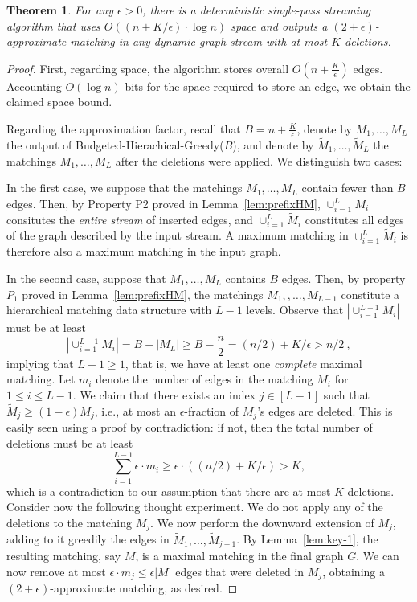 \documentclass[11pt,a4paper]{article}
\newtheorem{theorem}{Theorem}
\begin{document}
\setcounter{thmsaved}{\value{theorem}}
\setcounter{theorem}{\value{counterUB2}}
\addtocounter{theorem}{-1}

\begin{theorem}
For any $\epsilon > 0$, there is a deterministic single-pass streaming algorithm that uses $O((n + K/\epsilon) \cdot \log n)$ space and outputs a $(2+\epsilon)$-approximate matching in any dynamic graph stream with at most $K$ deletions.
\end{theorem} 


\setcounter{theorem}{\value{thmsaved}} 



\begin{proof}
First, regarding space, the algorithm stores overall  $O(n + \frac{K}{\epsilon})$ edges. Accounting $O(\log n)$ bits for the space required to store an edge, we obtain the claimed space bound.

Regarding the approximation factor, recall that $B = n + \frac{K}{\epsilon}$, denote by $M_1, \dots, M_L$ the output of \textsf{Budgeted-Hierachical-Greedy}($B$), and denote by $\tilde{M}_1, \dots, \tilde{M}_L$ the matchings $M_1, \dots, M_L$ after the deletions were applied. We distinguish two cases:

In the first case, we suppose that the matchings $M_1, \dots, M_{L}$ contain fewer than $B$ edges. Then, by Property P2 proved in Lemma~\ref{lem:prefixHM}, $\cup_{i=1}^{L}M_i$ consitutes the {\em entire stream} of inserted edges, and $\cup_{i=1}^L \tilde{M}_i$  constitutes all edges of the graph described by the input stream. A maximum matching in $\cup_{i=1}^L \tilde{M}_i$ is therefore also a maximum matching in the input graph. 

In the second case, suppose that $M_1, \dots, M_{L}$ contains $B$ edges.  Then, by property $P_1$ proved in Lemma~\ref{lem:prefixHM}, the matchings $M_1, , \dots, M_{L-1}$ constitute a hierarchical matching data structure with $L-1$ levels. Observe that $|\cup_{i=1}^{L-1}M_i|$ must be at least 
$$|\cup_{i=1}^{L-1}M_i| = B - |M_L| \ge B - \frac{n}{2} = (n/2) + K/\epsilon > n/2 \ ,$$ implying that $L-1 \ge 1$, that is,  we have at least one {\em complete} maximal matching. Let $m_i$ denote the number of edges in the matching $M_i$ for $1 \le i \le L-1$. 
We claim that there exists an index $j \in [L-1]$ such that $\tilde{M}_j \ge (1-\epsilon) M_j$, i.e., at most an $\epsilon$-fraction of $M_j$'s edges are deleted. This is easily seen using a proof by contradiction: if not, then the total number of deletions must be at least
$$\sum_{i=1}^{L-1} \epsilon \cdot m_i \ge \epsilon \cdot ((n/2) + K/\epsilon) > K,$$
which is a contradiction to our assumption that there are at most $K$ deletions. Consider now the following thought experiment. We do not apply any of the deletions to the matching $M_j$. We now perform the downward extension of $M_j$, adding to it greedily the edges in $\tilde{M}_1, \dots, \tilde{M}_{j-1}$. By Lemma~\ref{lem:key-1}, the resulting matching, say $M$, is a maximal matching in the final graph $G$. We can now remove at most $\epsilon \cdot m_j \le \epsilon |M|$ edges that were deleted in $M_j$, obtaining a $(2+\epsilon)$-approximate matching, as desired.
\end{proof}
\end{document}
